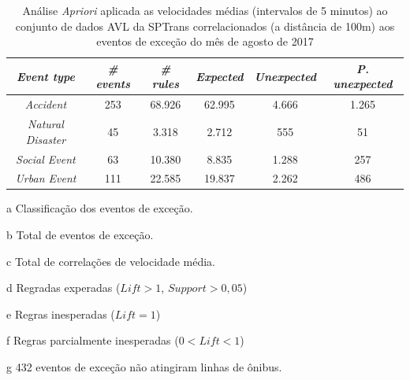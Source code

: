 \documentclass[
	12pt,				%
	oneside,			%
	a4paper,			%
	english,			%
	brazil				%
	]{abntex2ppgsi}
\begin{document}
\begin{apendicesenv}
\begin{table}[!htb]
\centering
\begin{threeparttable}
\caption {Análise \textit{Apriori} aplicada as velocidades médias (intervalos de 5 minutos) ao conjunto de dados AVL da SPTrans correlacionados (a distância de 100m) aos eventos de exceção do mês de agosto de 2017}
\label {tab:aprioriFull}
\begin{tabular}{c|c|c|c|c|c}
\hline
\textbf{\textit{Event type}}\tnote{a} & \textbf{\textit{\# events}}\tnote{b} & \textit{\textbf{\# rules}}\tnote{c} & \textbf{\textit{Expected}}\tnote{d} & \textbf{\textit{Unexpected}}\tnote{e} & \textbf{\textit{P. unexpected}}\tnote{f}   \\
\hline
\textit{Accident} & 253 & 68.926 & 62.995 & 4.666 & 1.265 \\
\textit{Natural Disaster} & 45 & 3.318 & 2.712 & 555 & 51 \\
\textit{Social Event} & 63 & 10.380 & 8.835 & 1.288 & 257 \\
\textit{Urban Event} & 111 & 22.585 & 19.837 & 2.262 & 486 \\
\hline
\end{tabular}
\begin{tablenotes}
            \item[a] Classificação dos eventos de exceção.
            \item[b] Total de eventos de exceção.
            \item[c] Total de correlações de velocidade média.
            \item[d] Regradas experadas ($Lift > 1$, $Support > 0,05$)
            \item[e] Regras inesperadas ($Lift = 1$)
            \item[f] Regras parcialmente inesperadas ($0 < Lift < 1$)
            \item[g] 432 eventos de exceção não atingiram linhas de ônibus.
        \end{tablenotes}
\end{threeparttable}
\end{table}


\end{apendicesenv}
\end{document}
